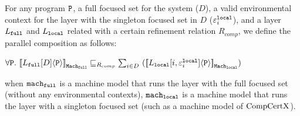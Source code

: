\begin{definition}
\label{definition:conlink:parallel-composition}
For any program $ {\mathrm{\texttt{P}}}$, a full focused set for the system ($D$), a valid environmental context for the layer with the singleton focused set in $D$ (${\varepsilon}^{{\mathrm{\texttt{local}}}}_{i}$), and a layer $L_{{\mathrm{\texttt{full}}}}$ and $L_{{\mathrm{\texttt{local}}}}$ related with a certain 
refinement relation $R_{comp}$, we define the parallel composition as follows:
\begin{center}
$\forall \codeinmath{P}. \ \semwmachine{L_{\codeinmath{full}}[D]}{\codeinmath{P}}{\machkwd_{\codeinmath{full}}} \refines_{R_{comp}} \sum_{i \in D}\  (\semwmachine{\PLayer{L_{\codeinmath{local}}}{i}{\oracle^{\codeinmath{local}}_i}}{\codeinmath{P}}{\machkwd_{\codeinmath{local}}})$
\end{center}
when  ${\mathrm{\texttt{mach}}}_{{\mathrm{\texttt{full}}}}$ is a machine model that runs the layer with the full focused set (without any environmental contexts),
${\mathrm{\texttt{mach}}}_{{\mathrm{\texttt{local}}}}$ is a machine model that runs the layer with a singleton focused set (such as a machine model of $\mathrm{CompCertX}$).
\end{definition}

